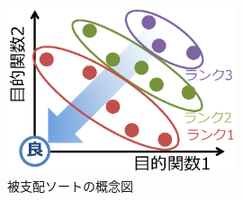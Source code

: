 \begin{figure}[ht]
    \begin{center}
        \includegraphics[width=0.6\textwidth,keepaspectratio=true]{fig/theory_rank.eps}
    \end{center}
    \caption{被支配ソートの概念図}
    \label{fig::theory_rank}
\end{figure}

